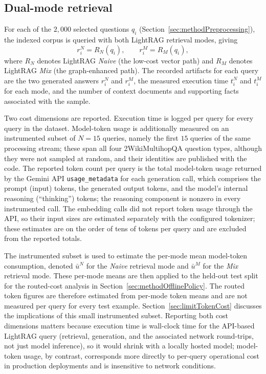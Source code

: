 \documentclass[english, bibtex]{kththesis}               %
\numberwithin{listing}{chapter}
\begin{document}
\subsection{Dual-mode retrieval}
\label{sec:methodDualMode}

For each of the $2{,}000$ selected questions \(q_i\) (Section~\ref{sec:methodPreprocessing}), the indexed corpus is queried with both LightRAG retrieval modes, giving
\begin{equation}
\label{eq:dualModeOutputs}
r_i^{N} = R_N(q_i),
\qquad
r_i^{M} = R_M(q_i),
\end{equation}
where \(R_N\) denotes LightRAG \emph{Naive} (the low-cost vector path) and \(R_M\) denotes LightRAG \emph{Mix} (the graph-enhanced path). The recorded artifacts for each query are the two generated answers \(r_i^N\) and \(r_i^M\), the measured execution time \(t_i^N\) and \(t_i^M\) for each mode, and the number of context documents and supporting facts associated with the sample.

Two cost dimensions are reported. Execution time is logged per query for every query in the dataset. Model-token usage is additionally measured on an instrumented subset of \(N = 15\) queries, namely the first $15$ queries of the same processing stream; these span all four 2WikiMultihopQA question types, although they were not sampled at random, and their identities are published with the code. The reported token count per query is the total model-token usage returned by the Gemini \gls{API} \texttt{usage\_metadata} for each generation call, which comprises the prompt (input) tokens, the generated output tokens, and the model's internal reasoning (``thinking'') tokens; the reasoning component is nonzero in every instrumented call. The embedding calls did not report token usage through the API, so their input sizes are estimated separately with the configured tokenizer; these estimates are on the order of tens of tokens per query and are excluded from the reported totals.

The instrumented subset is used to estimate the per-mode mean model-token consumption, denoted $\bar{u}^N$ for the \emph{Naive} retrieval mode and $\bar{u}^M$ for the \emph{Mix} retrieval mode. These per-mode means are then applied to the held-out test split for the routed-cost analysis in Section~\ref{sec:methodOfflinePolicy}. The routed token figures are therefore estimated from per-mode token means and are not measured per query for every test example. Section~\ref{sec:limitTokenCost} discusses the implications of this small instrumented subset. Reporting both cost dimensions matters because execution time is wall-clock time for the API-based LightRAG query (retrieval, generation, and the associated network round-trips, not just model inference), so it would shrink with a locally hosted model; model-token usage, by contrast, corresponds more directly to per-query operational cost in production deployments and is insensitive to network conditions.
\end{document}

